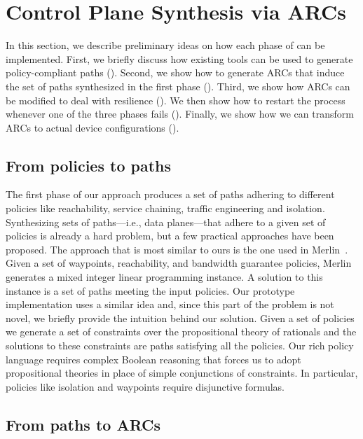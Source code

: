 \section{Control Plane Synthesis via ARCs} \label{sec:synthesis}
In this section, we describe preliminary ideas on how each phase of 
 can be implemented.
First, we briefly discuss how existing tools can be used to generate
policy-compliant paths ().
Second, we show how to generate ARCs that induce
the set of paths synthesized in the first phase ().
Third, we show how ARCs can be modified to deal with resilience ().
We then show how to restart the process whenever one of the three phases fails ().
Finally, we show how we can transform ARCs to actual device configurations (). 

\subsection{From policies to paths} \label{sec:phase1}
The first phase of our approach produces a set of paths adhering to
different policies like reachability, service chaining, traffic engineering and isolation.
Synthesizing sets of paths---i.e., data planes---that adhere to a given set of policies
is already a hard problem, but a few practical approaches have been proposed.
The approach that is most similar to ours is the one used in Merlin~\cite{merlin}.
Given a set of waypoints, reachability, and bandwidth guarantee policies,
Merlin generates a mixed integer linear programming instance. 
A solution to this instance is a set of paths meeting the input policies.
Our prototype implementation uses a similar idea and,
since this part of the problem is not novel, we briefly provide the intuition behind our solution.
Given a set of policies we generate a set of constraints over the propositional theory of rationals 
and the solutions to these constraints are paths satisfying all the policies.
Our rich policy language requires complex Boolean reasoning that forces us to adopt propositional theories
in place of simple conjunctions of constraints.
In particular, policies like isolation and waypoints require disjunctive formulas.



\subsection{From paths to ARCs} \label{sec:phase2}

